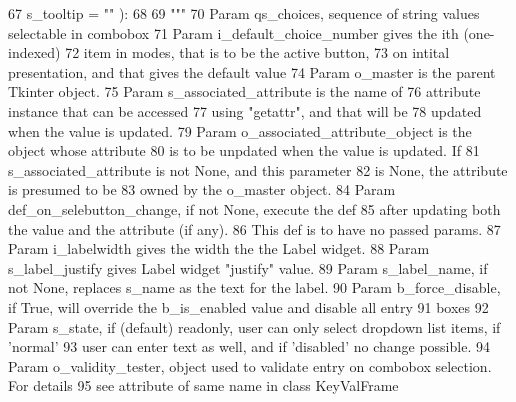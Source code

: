 \begin{DoxyCode}
67             s\_tooltip = \textcolor{stringliteral}{""} ):
68 
69         \textcolor{stringliteral}{"""}
70 \textcolor{stringliteral}{        Param qs\_choices, sequence of string values selectable in combobox}
71 \textcolor{stringliteral}{        Param i\_default\_choice\_number gives the ith (one-indexed)}
72 \textcolor{stringliteral}{            item in modes, that is to be the active button,}
73 \textcolor{stringliteral}{            on intital presentation, and that gives the default value}
74 \textcolor{stringliteral}{        Param o\_master is the parent Tkinter object.}
75 \textcolor{stringliteral}{                Param s\_associated\_attribute is the name of }
76 \textcolor{stringliteral}{            attribute instance that can be accessed}
77 \textcolor{stringliteral}{            using "getattr", and that will be}
78 \textcolor{stringliteral}{            updated when the value is updated.}
79 \textcolor{stringliteral}{        Param o\_associated\_attribute\_object is the object whose attribute}
80 \textcolor{stringliteral}{            is to be unpdated when the value is updated.  If}
81 \textcolor{stringliteral}{            s\_associated\_attribute is not None, and this parameter}
82 \textcolor{stringliteral}{            is None, the attribute is presumed to be}
83 \textcolor{stringliteral}{            owned by the o\_master object.}
84 \textcolor{stringliteral}{        Param def\_on\_selebutton\_change, if not None, execute the def}
85 \textcolor{stringliteral}{            after updating both the value and the attribute (if any).}
86 \textcolor{stringliteral}{            This def is to have no passed params.}
87 \textcolor{stringliteral}{        Param i\_labelwidth gives the width the the Label widget.}
88 \textcolor{stringliteral}{        Param s\_label\_justify gives Label widget "justify" value.}
89 \textcolor{stringliteral}{        Param s\_label\_name, if not None, replaces s\_name as the text for the label.}
90 \textcolor{stringliteral}{        Param b\_force\_disable, if True, will override the b\_is\_enabled value and disable all entry }
91 \textcolor{stringliteral}{              boxes}
92 \textcolor{stringliteral}{        Param s\_state, if (default) readonly, user can only select dropdown list items, if 'normal'}
93 \textcolor{stringliteral}{              user can enter text as well, and if 'disabled' no change possible.}
94 \textcolor{stringliteral}{        Param o\_validity\_tester, object used to validate entry on combobox selection.  For details}
95 \textcolor{stringliteral}{             see attribute of same name in class KeyValFrame}

\end{DoxyCode}
